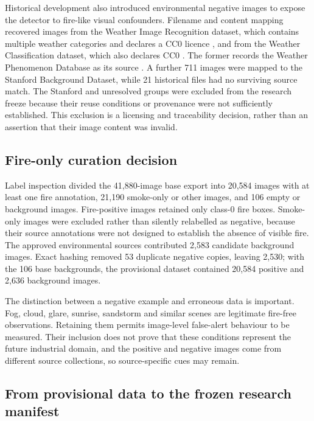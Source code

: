 Historical development also introduced environmental negative images to expose
the detector to fire-like visual confounders. Filename and content mapping
recovered images from the Weather Image Recognition dataset, which contains
multiple weather categories and declares a CC0 licence
\cite{BhathenaWeatherDataset}, and from the Weather Classification dataset,
which also declares CC0 \cite{GuptaWeatherClassification}. The former records
the Weather Phenomenon Database as its source \cite{Xiao2021WEAPD}. A further
711 images were mapped to the Stanford Background Dataset, while 21 historical
files had no surviving source match. The Stanford and unresolved groups were
excluded from the research freeze because their reuse conditions or provenance
were not sufficiently established. This exclusion is a licensing and
traceability decision, rather than an assertion that their image content was
invalid.

\subsection{Fire-only curation decision}

Label inspection divided the 41,880-image base export into 20,584 images with
at least one fire annotation, 21,190 smoke-only or other images, and 106 empty
or background images. Fire-positive images retained only class-0 fire boxes.
Smoke-only images were excluded rather than silently relabelled as negative,
because their source annotations were not designed to establish the absence of
visible fire. The approved environmental sources contributed 2,583 candidate
background images. Exact hashing removed 53 duplicate negative copies, leaving
2,530; with the 106 base backgrounds, the provisional dataset contained
20,584 positive and 2,636 background images.

The distinction between a negative example and erroneous data is important.
Fog, cloud, glare, sunrise, sandstorm and similar scenes are legitimate
fire-free observations. Retaining them permits image-level false-alert
behaviour to be measured. Their inclusion does not prove that these conditions
represent the future industrial domain, and the positive and negative images
come from different source collections, so source-specific cues may remain.

\subsection{From provisional data to the frozen research manifest}

